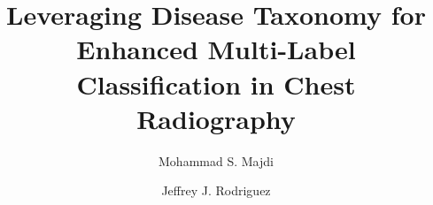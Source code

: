 \documentclass[final,1p,times,authoryear]{elsarticle}
\begin{document}
\begin{frontmatter}

    \title{Leveraging Disease Taxonomy for Enhanced Multi-Label Classification in Chest Radiography}
    \author[]{Mohammad S\@. Majdi}
    \author[]{Jeffrey J\@. Rodriguez}

    \begin{abstract}
        
    \end{abstract}
    \begin{keyword}
        
    \end{keyword}



\end{frontmatter}





\end{document}
